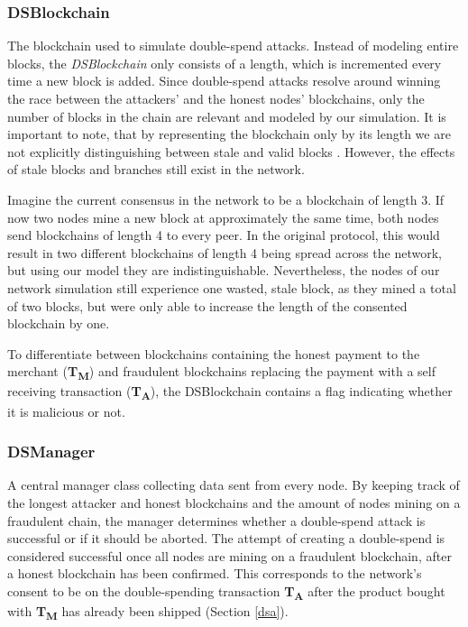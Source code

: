 \documentclass[a4paper,12pt,twoside]{report}
\begin{document}
\subsubsection{DSBlockchain}
The blockchain used to simulate double-spend attacks. Instead of modeling entire blocks, the \textit{DSBlockchain} only consists of a length, which is incremented every time a new block is added. Since double-spend attacks resolve around winning the race between the attackers' and the honest nodes' blockchains, only the number of blocks in the chain are relevant and modeled by our simulation. It is important to note, that by representing the blockchain only by its length we are not explicitly distinguishing between stale and valid blocks . However, the effects of stale blocks and branches still exist in the network. 

Imagine the current consensus in the network to be a blockchain of length 3. If now two nodes mine a new block at approximately the same time, both nodes send blockchains of length 4 to every peer. In the original protocol, this would result in two different blockchains of length 4 being spread across the network, but using our model they are indistinguishable. Nevertheless, the nodes of our network simulation still experience one wasted, stale block, as they mined a total of two blocks, but were only able to increase the length of the consented blockchain by one.

To differentiate between blockchains containing the honest payment to the merchant (\textbf{T\textsubscript{M}}) and fraudulent blockchains replacing the payment with a self receiving transaction (\textbf{T\textsubscript{A}}), the DSBlockchain contains a flag indicating whether it is malicious or not.
\subsubsection{DSManager} \label{manager}
A central manager class collecting data sent from every node. By keeping track of the longest attacker and honest blockchains and the amount of nodes mining on a fraudulent chain, the manager determines whether a double-spend attack is successful or if it should be aborted. The attempt of creating a double-spend is considered successful once all nodes are mining on a fraudulent blockchain, after a honest blockchain has been confirmed. This corresponds to the network's consent to be on the double-spending transaction \textbf{T\textsubscript{A}} after the product bought with \textbf{T\textsubscript{M}} has already been shipped (Section \ref{dsa}). 
\end{document}
